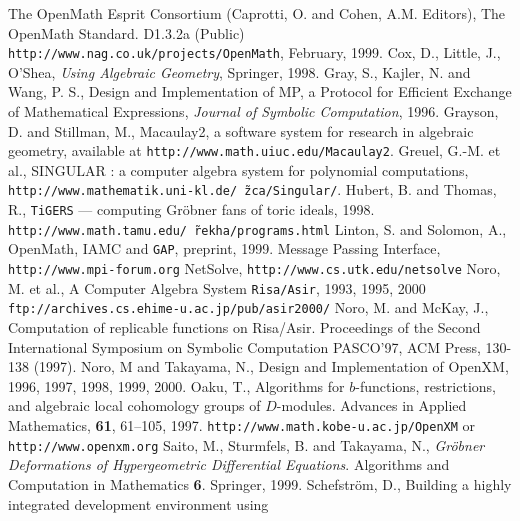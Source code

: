 
\begin{thebibliography}{X}
The OpenMath Esprit Consortium 
(Caprotti, O. and Cohen, A.M. Editors),
The OpenMath Standard. D1.3.2a (Public) \\
{\footnotesize \tt http://www.nag.co.uk/projects/OpenMath},
February, 1999.
Cox, D., Little, J.,  O'Shea,
{\it Using Algebraic Geometry}, Springer, 1998.
Gray, S., Kajler, N. and Wang, P. S.,
Design and Implementation of MP, a Protocol for Efficient
  Exchange of Mathematical Expressions,
{\sl Journal of Symbolic Computation}, 1996.
Grayson, D. and Stillman, M.,
Macaulay2, a software system for research in algebraic geometry,
available at {\tt http://www.math.uiuc.edu/Macaulay2}.
Greuel, G.-M. et al., SINGULAR : a computer algebra system for polynomial
computations, \\
{\tt http://www.mathematik.uni-kl.de/\~\,zca/Singular/}.
Hubert, B. and Thomas, R.,
{\tt TiGERS} --- computing Gr\"obner fans of toric
ideals, 1998.
{\footnotesize
{\tt http://www.math.tamu.edu/\~\,rekha/programs.html}}
Linton, S. and Solomon, A.,
OpenMath, IAMC and {\tt GAP},
preprint, 1999.
 Message Passing Interface,
{\tt http://www.mpi-forum.org} 
NetSolve, {\tt http://www.cs.utk.edu/netsolve}
Noro, M. et al., 
A Computer Algebra System {\tt Risa/Asir},  1993, 1995, 2000\\
{\tt ftp://archives.cs.ehime-u.ac.jp/pub/asir2000/}
Noro, M. and McKay, J.,
Computation of replicable functions on Risa/Asir.
Proceedings of the Second International Symposium on
Symbolic Computation PASCO'97, ACM Press, 130-138 (1997).
Noro, M and Takayama, N., Design and Implementation
of OpenXM, 1996, 1997, 1998, 1999, 2000.
Oaku, T.,
Algorithms for $b$-functions, restrictions, and algebraic local cohomology
groups of $D$-modules.
Advances in Applied Mathematics, {\bf 61}, 61--105, 1997.
{\footnotesize {\tt http://www.math.kobe-u.ac.jp/OpenXM}}
or 
{\footnotesize {\tt http://www.openxm.org}}
Saito, M., Sturmfels, B. and Takayama, N.,
{\it Gr\"obner Deformations of Hypergeometric Differential Equations}.
Algorithms and Computation in Mathematics {\bf 6}. Springer, 1999.
Schefstr\"om, D.,
Building a highly integrated development environment using

\end{thebibliography}
